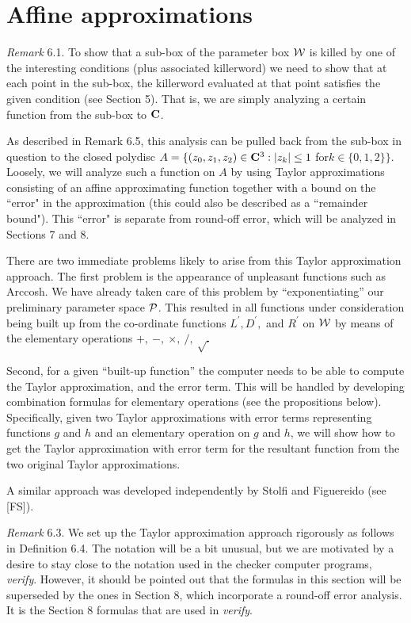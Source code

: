\section{Affine approximations}

 
{\it Remark} 6.1.
To show that a sub-box of the parameter box ${\cal W}$ is killed by one of the interesting conditions (plus associated killerword) we need to show that at each point in the sub-box, the killerword evaluated at that point satisfies the given condition (see
Section 5).  That is, we are simply analyzing a certain function from the sub-box to ${\bf C}$.  

As described in Remark 6.5, this analysis can be pulled back from the sub-box in question to the closed polydisc 
$A = \{(z_0,z_1,z_2) \in {\bf C}^3 : |z_k| \le 1$  for\break $k \in \{0,1,2\}\}.$  
Loosely,  we will analyze such a function on $A$ by using  Taylor approximations consisting of an affine approximating
function together with a bound on the ``error" in the approximation (this could also be described as a ``remainder bound").  This ``error" 
is separate from round-off error,  which will be analyzed in Sections 7 and 8.  

There are two immediate problems likely to arise from this Taylor approximation approach.
The first problem is the appearance of unpleasant functions such as 
Arccosh.  We have already taken care of this problem by ``exponentiating'' our preliminary parameter space ${\cal P}$.  This resulted in all functions under consideration being built up from the co-ordinate functions $ L^{\prime}, D^{\prime},$ and $ R^{\prime}$ on ${\cal W}$ by means of the elementary operations $+,\ -,\ \times,\ /,\ \sqrt.$ 

Second,  for a given ``built-up function'' the computer needs to be able to compute the Taylor approximation, and the error term.  This will be handled 
by developing combination formulas for elementary operations (see the propositions below).  Specifically, given two Taylor
approximations with error terms representing functions $g$ and $h$ and an elementary operation on $g$ and $h$, we will show how to
get the Taylor approximation with error term for the resultant function from the two original Taylor approximations. 

A similar approach was developed independently by Stolfi and Figuereido (see [FS]).
\enddemo

{\it Remark} 6.3.
We set up the Taylor approximation approach rigorously as follows in Definition 6.4.  The notation will be a bit unusual, but we are motivated by a desire to stay close to the notation used in the checker computer programs, {\it verify}.  However, it should be pointed out that the formulas in this
section will be superseded by the ones in Section 8, which incorporate a round-off error analysis.  It is the Section 8 formulas that are
used in {\it verify}.

